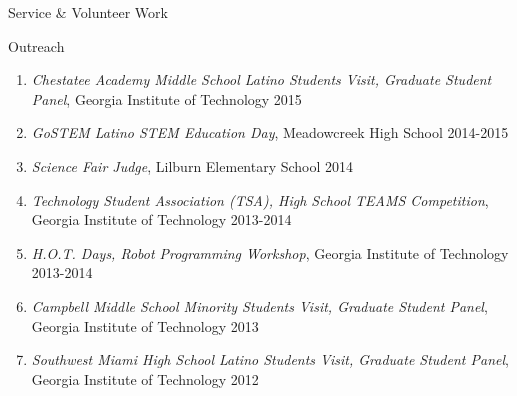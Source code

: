 \documentclass{resume} %
\newcommand{\sectionspace}{\vspace{3mm}}
\newcommand{\simplelistentry}[3]{\textit{#1}, {#2} \hfill {#3}}
\begin{document}
\begin{rSection}{Service \& Volunteer Work}
\begin{rSubsection}{Outreach}{}{}{}
\begin{enumerate}
\item \simplelistentry{Chestatee Academy Middle School Latino Students Visit,
    Graduate Student Panel}{Georgia Institute of Technology}{2015}

\item \simplelistentry{GoSTEM Latino STEM Education Day}{Meadowcreek High
    School}{2014-2015}

\item \simplelistentry{Science Fair Judge}{Lilburn Elementary School}{2014}

\item \simplelistentry{Technology Student Association (TSA), High School TEAMS
    Competition}{Georgia Institute of Technology}{2013-2014}

\item \simplelistentry{H.O.T. Days, Robot Programming Workshop}{Georgia
    Institute of Technology}{2013-2014}

\item \simplelistentry{Campbell Middle School Minority Students Visit, Graduate
    Student Panel}{Georgia Institute of Technology}{2013}

\item \simplelistentry{Southwest Miami High School Latino Students Visit,
    Graduate Student Panel}{Georgia Institute of Technology}{2012}

\end{enumerate}
\end{rSubsection}

\end{rSection}

\fi





\iffalse
\sectionspace
\begin{rSection}{References}
Available upon request.
\end{rSection}
\fi


\end{document}
